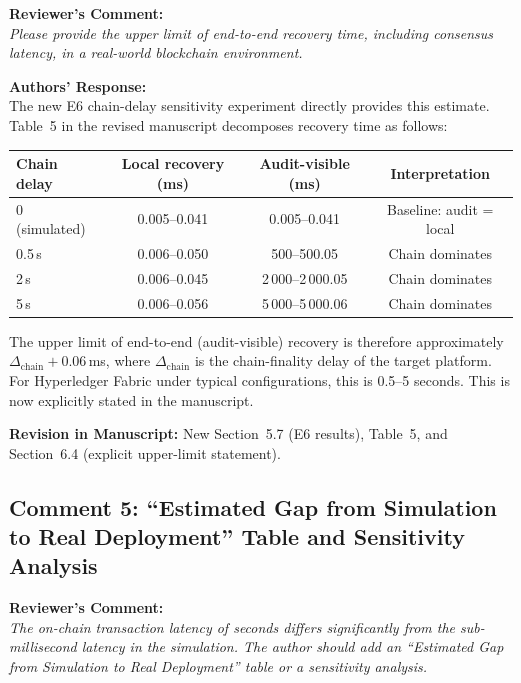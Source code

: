 \documentclass[11pt,a4paper]{article}
\newcommand{\reviewercomment}[1]{%
  \vspace{6pt}\noindent\textbf{\textcolor{reviewercolor}{Reviewer's Comment:}}\\
  \textcolor{reviewercolor}{\itshape #1}\vspace{4pt}}
\newcommand{\response}[1]{%
  \noindent\textbf{\textcolor{responsecolor}{Authors' Response:}}\\
  #1\vspace{8pt}}
\newcommand{\revision}[1]{%
  \noindent\textbf{Revision in Manuscript:} #1\vspace{4pt}}
\begin{document}
\reviewercomment{Please provide the upper limit of end-to-end recovery time, including consensus latency, in a real-world blockchain environment.}

\response{The new E6 chain-delay sensitivity experiment directly provides this estimate. Table~5 in the revised manuscript decomposes recovery time as follows:

\begin{center}
\small
\begin{tabular}{lccc}
\toprule
\textbf{Chain delay} & \textbf{Local recovery (ms)} & \textbf{Audit-visible (ms)} & \textbf{Interpretation} \\
\midrule
0 (simulated)   & 0.005--0.041 & 0.005--0.041 & Baseline: audit = local \\
0.5\,s          & 0.006--0.050 & 500--500.05 & Chain dominates \\
2\,s            & 0.006--0.045 & 2\,000--2\,000.05 & Chain dominates \\
5\,s            & 0.006--0.056 & 5\,000--5\,000.06 & Chain dominates \\
\bottomrule
\end{tabular}
\end{center}

The upper limit of end-to-end (audit-visible) recovery is therefore approximately $\Delta_{\text{chain}} + 0.06\,$ms, where $\Delta_{\text{chain}}$ is the chain-finality delay of the target platform. For Hyperledger Fabric under typical configurations, this is 0.5--5 seconds. This is now explicitly stated in the manuscript.}

\revision{New Section~5.7 (E6 results), Table~5, and Section~6.4 (explicit upper-limit statement).}

\subsection*{Comment 5: ``Estimated Gap from Simulation to Real Deployment'' Table and Sensitivity Analysis}

\reviewercomment{The on-chain transaction latency of seconds differs significantly from the sub-millisecond latency in the simulation. The author should add an ``Estimated Gap from Simulation to Real Deployment'' table or a sensitivity analysis.}
\end{document}
